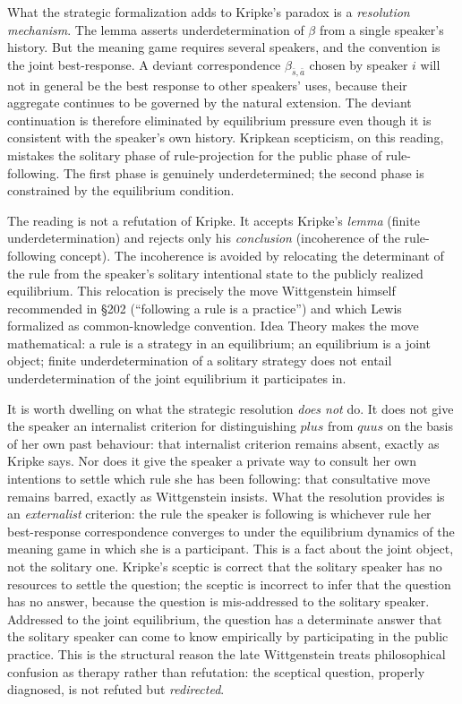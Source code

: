 What the strategic formalization adds to Kripke's paradox is a
\emph{resolution mechanism}. The lemma asserts underdetermination of
$\beta$ from a single speaker's history. But the meaning game requires
several speakers, and the convention is the joint best-response. A
deviant correspondence $\beta_{\bar s,\bar a}$ chosen by speaker $i$
will not in general be the best response to other speakers' uses,
because their aggregate continues to be governed by the natural
extension. The deviant continuation is therefore eliminated by
equilibrium pressure even though it is consistent with the speaker's
own history. Kripkean scepticism, on this reading, mistakes the
solitary phase of rule-projection for the public phase of rule-following.
The first phase is genuinely underdetermined; the second phase is
constrained by the equilibrium condition.

The reading is not a refutation of Kripke. It accepts Kripke's
\emph{lemma} (finite underdetermination) and rejects only his
\emph{conclusion} (incoherence of the rule-following concept). The
incoherence is avoided by relocating the determinant of the rule
from the speaker's solitary intentional state to the publicly
realized equilibrium. This relocation is precisely the move
Wittgenstein himself recommended in \S202 (``following a rule is a
practice'') and which Lewis~\cite{Lewis1969} formalized as
common-knowledge convention. Idea Theory makes the move
mathematical: a rule is a strategy in an equilibrium; an
equilibrium is a joint object; finite underdetermination of a
solitary strategy does not entail underdetermination of the joint
equilibrium it participates in.

It is worth dwelling on what the strategic resolution \emph{does not}
do. It does not give the speaker an internalist criterion for
distinguishing $\textit{plus}$ from $\textit{quus}$ on the basis of her
own past behaviour: that internalist criterion remains absent, exactly
as Kripke says. Nor does it give the speaker a private way to consult
her own intentions to settle which rule she has been following: that
consultative move remains barred, exactly as Wittgenstein insists. What
the resolution provides is an \emph{externalist} criterion: the rule
the speaker is following is whichever rule her best-response
correspondence converges to under the equilibrium dynamics of the
meaning game in which she is a participant. This is a fact about the
joint object, not the solitary one. Kripke's sceptic is correct that
the solitary speaker has no resources to settle the question; the
sceptic is incorrect to infer that the question has no answer, because
the question is mis-addressed to the solitary speaker. Addressed to
the joint equilibrium, the question has a determinate answer that the
solitary speaker can come to know empirically by participating in the
public practice. This is the structural reason the late Wittgenstein
treats philosophical confusion as therapy rather than refutation: the
sceptical question, properly diagnosed, is not refuted but
\emph{redirected}.

